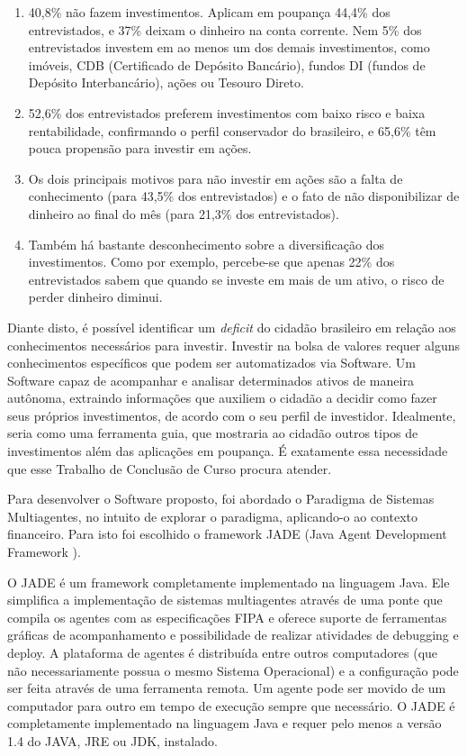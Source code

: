 \begin{citacao}
\begin{enumerate}
\item 40,8\% não fazem investimentos. Aplicam em poupança 44,4\% dos entrevistados, e 37\% deixam o dinheiro na conta corrente. Nem 5\% dos entrevistados investem em ao menos um dos demais investimentos, como imóveis, CDB (Certificado de Depósito Bancário), fundos DI (fundos de Depósito Interbancário), ações ou Tesouro Direto.
\item 52,6\% 	dos entrevistados preferem investimentos com baixo risco e baixa rentabilidade, confirmando o perfil conservador do brasileiro, e 65,6\% têm pouca propensão para investir em ações.
\item Os dois principais motivos para não investir em ações são a falta de conhecimento (para 43,5\% dos entrevistados) e o fato de não disponibilizar de dinheiro ao final do mês (para 21,3\% dos entrevistados).
\item Também há bastante desconhecimento sobre a diversificação dos investimentos. Como por exemplo, percebe-se que apenas 22\% dos entrevistados sabem que quando se investe em mais de um ativo, o risco de perder dinheiro diminui.\cite{isabella2013}

\end{enumerate}
\end{citacao}

Diante disto, é possível identificar um \textit{deficit} do cidadão brasileiro em relação aos conhecimentos necessários para investir. Investir na bolsa de valores requer alguns conhecimentos específicos que podem ser automatizados via Software. Um Software capaz de acompanhar e analisar determinados ativos de maneira autônoma, extraindo informações que auxiliem o cidadão a decidir como fazer seus próprios investimentos, de acordo com o seu perfil de investidor. Idealmente, seria como uma ferramenta guia, que mostraria ao cidadão outros tipos de investimentos além das aplicações em poupança. É exatamente essa necessidade que esse Trabalho de Conclusão de Curso procura atender.

Para desenvolver o Software proposto, foi abordado o Paradigma de Sistemas Multiagentes, no intuito de explorar o paradigma, aplicando-o ao contexto financeiro. Para isto foi escolhido o framework JADE  (Java Agent Development Framework ).

\begin{citacao}
O JADE é um framework completamente implementado na linguagem Java. Ele simplifica a implementação de sistemas multiagentes através de uma ponte que compila os agentes com as especificações FIPA e oferece suporte de ferramentas gráficas de acompanhamento e possibilidade de realizar atividades de debugging e deploy.  A plataforma de agentes é distribuída entre outros computadores (que não necessariamente possua o mesmo Sistema Operacional) e a configuração pode ser feita através de uma ferramenta remota. Um agente pode ser movido de um computador para outro em tempo de execução sempre que necessário. O JADE é completamente implementado na linguagem Java e requer pelo menos a versão 1.4 do JAVA, JRE ou  JDK, instalado. \cite{telecon2014}
\end{citacao}

